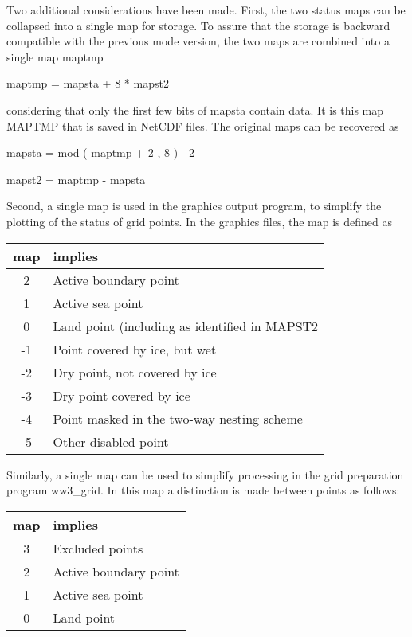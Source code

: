 Two additional considerations have been made. First, the two status maps can
be collapsed into a single map for storage. To assure that the storage is
backward compatible with the previous mode version, the two maps are combined
into a single map {\F maptmp}

\vspace{\baselineskip}
\centerline{\F maptmp = mapsta + 8 * mapst2}
\vspace{\baselineskip}

\noindent
considering that only the first few bits of {\F mapsta} contain data.
It is this map MAPTMP that is saved in NetCDF files.  The
original maps can be recovered as

\vspace{\baselineskip}
\centerline{\F mapsta = mod ( maptmp + 2 , 8 ) - 2}
\centerline{\F mapst2 = maptmp - mapsta}
\vspace{\baselineskip}

\noindent
Second, a single map is used in the graphics output program, to simplify the
plotting of the status of grid points. In the graphics files, the map is
defined as

\begin{center} \begin{tabular}{cl}
{map} & implies \\ \hline
  2 & Active boundary point \\
  1 & Active sea point      \\
  0 & Land point (including as identified in {\F MAPST2} \\
 -1 & Point covered by ice, but wet \\
 -2 & Dry point, not covered by ice \\
 -3 & Dry point covered by ice \\
 -4 & Point masked in the two-way nesting scheme \\
 -5 & Other disabled point
\end{tabular} \end{center}

\noindent
Similarly, a single map can be used to simplify processing in the grid
preparation program {\file ww3\_grid}. In this map a distinction is made
between points as follows:

\begin{center} \begin{tabular}{cl}
{map} & implies \\ \hline
  3 & Excluded points \\
  2 & Active boundary point \\
  1 & Active sea point      \\
  0 & Land point 
\end{tabular} \end{center}
